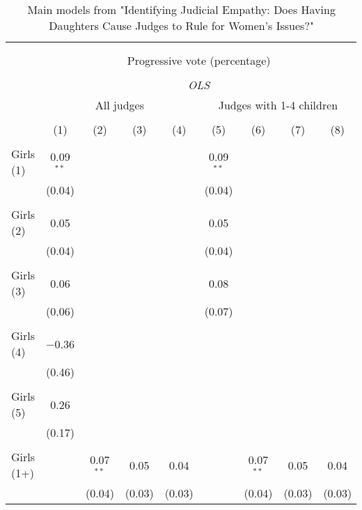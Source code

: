 
\begin{table}[h] \centering 
  \caption{Main models from "Identifying Judicial Empathy: Does Having Daughters Cause Judges to Rule for Women's Issues?"} 
  \label{replication_table} 
\begin{adjustbox}{width=1\textwidth}\begin{tabular}{@{\extracolsep{5pt}}lcccccccc} 
\\[-1.8ex]\hline 
\hline \\[-1.8ex] 
\\[-1.8ex] & \multicolumn{8}{c}{Progressive vote (percentage)} \\ 
\\[-1.8ex] & \multicolumn{8}{c}{\textit{OLS}} \\ 
 & \multicolumn{4}{c}{All judges} & \multicolumn{4}{c}{Judges with 1-4 children} \\ 
\\[-1.8ex] & (1) & (2) & (3) & (4) & (5) & (6) & (7) & (8)\\ 
\hline \\[-1.8ex] 
 Girls (1) & 0.09$^{**}$ &  &  &  & 0.09$^{**}$ &  &  &  \\ 
  & (0.04) &  &  &  & (0.04) &  &  &  \\ 
  & & & & & & & & \\ 
 Girls (2) & 0.05 &  &  &  & 0.05 &  &  &  \\ 
  & (0.04) &  &  &  & (0.04) &  &  &  \\ 
  & & & & & & & & \\ 
 Girls (3) & 0.06 &  &  &  & 0.08 &  &  &  \\ 
  & (0.06) &  &  &  & (0.07) &  &  &  \\ 
  & & & & & & & & \\ 
 Girls (4) & $-$0.36 &  &  &  &  &  &  &  \\ 
  & (0.46) &  &  &  &  &  &  &  \\ 
  & & & & & & & & \\ 
 Girls (5) & 0.26 &  &  &  &  &  &  &  \\ 
  & (0.17) &  &  &  &  &  &  &  \\ 
  & & & & & & & & \\ 
 Girls (1+) &  & 0.07$^{**}$ & 0.05 & 0.04 &  & 0.07$^{**}$ & 0.05 & 0.04 \\ 
  &  & (0.04) & (0.03) & (0.03) &  & (0.04) & (0.03) & (0.03) \\ 

\end{tabular}
\end{adjustbox}
\end{table}
